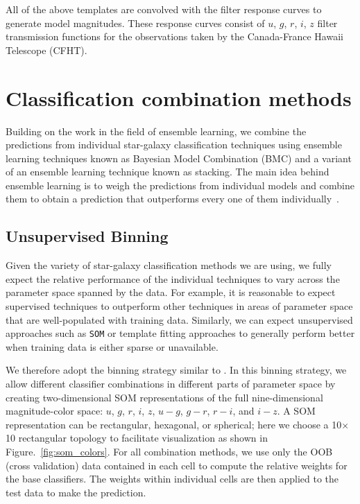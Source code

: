 \documentclass[useAMS,usenatbib]{mn2e}
\begin{document}
All of the above templates are convolved
with the filter response curves to generate model magnitudes.
These response curves consist of
$u$, $g$, $r$, $i$, $z$ filter transmission functions
for the observations taken by the
Canada-France Hawaii Telescope (CFHT).


\section{Classification combination methods}
  \label{section:classification_combination_methods}

Building on the work in the field of ensemble learning,
we combine the predictions from
individual star-galaxy classification techniques
using ensemble learning techniques known as
Bayesian Model Combination (BMC)
and a variant of an ensemble learning technique known as stacking.
The main idea behind ensemble learning is to weigh
the predictions from individual models
and combine them to obtain a prediction
that outperforms every one of 
them individually~\citep{rokach2010ensemble}.

\subsection{Unsupervised Binning}
  \label{section:random_atlas}

Given the variety of star-galaxy classification methods
we are using,
we fully expect the relative performance
of the individual techniques to vary across
the parameter space spanned by the data.
For example, it is reasonable to expect 
supervised techniques to outperform other techniques
in areas of parameter space that are well-populated
with training data.
Similarly, we can expect unsupervised approaches
such as \texttt{SOM} or template fitting approaches 
to generally perform better when training data
is either sparse or unavailable.

We therefore adopt the binning strategy similar to 
\cite{carrascokind2014exhausting}.
In this binning strategy,
we allow different classifier combinations 
in different parts of parameter space
by creating two-dimensional SOM representations of
the full nine-dimensional magnitude-color space:
$u$, $g$, $r$, $i$, $z$, $u-g$, $g-r$, $r-i$, and $i-z$.
A SOM representation can be rectangular, hexagonal, or spherical;
here we choose a 10$\times$10 rectangular topology to facilitate 
visualization as shown in Figure.~\ref{fig:som_colors}.
For all combination methods,
we use only the OOB (cross validation) data contained in each cell
to compute the relative weights for the base classifiers.
The weights within individual cells are then applied to the test data
to make the prediction.
\end{document}
